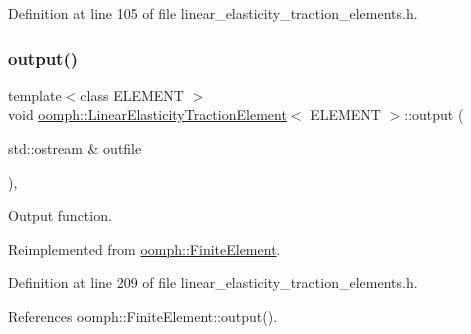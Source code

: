 Definition at line 105 of file linear\+\_\+elasticity\+\_\+traction\+\_\+elements.\+h.

\mbox{\label{classoomph_1_1LinearElasticityTractionElement_a1d0d93c959c51f92c9ac40a71c0a85db}} 
\subsubsection{\texorpdfstring{output()}{output()}\hspace{0.1cm}{\footnotesize\ttfamily [1/4]}}
{\footnotesize\ttfamily template$<$class E\+L\+E\+M\+E\+NT $>$ \\
void \hyperlink{classoomph_1_1LinearElasticityTractionElement}{oomph\+::\+Linear\+Elasticity\+Traction\+Element}$<$ E\+L\+E\+M\+E\+NT $>$\+::output (\begin{DoxyParamCaption}\item[{std\+::ostream \&}]{outfile }\end{DoxyParamCaption})\hspace{0.3cm}{\ttfamily [inline]}, {\ttfamily [virtual]}}



Output function. 



Reimplemented from \hyperlink{classoomph_1_1FiniteElement_a2ad98a3d2ef4999f1bef62c0ff13f2a7}{oomph\+::\+Finite\+Element}.



Definition at line 209 of file linear\+\_\+elasticity\+\_\+traction\+\_\+elements.\+h.



References oomph\+::\+Finite\+Element\+::output().

\mbox{\label{classoomph_1_1LinearElasticityTractionElement_a396767d3d935bd219bf2161ed461a174}} 
